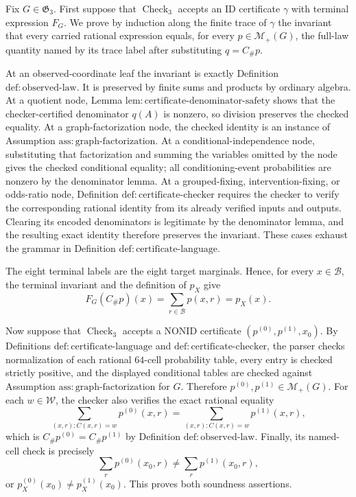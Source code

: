 Fix \(G\in\mathfrak G_3\).  First suppose that \(\operatorname{Check}_3\) accepts an \(\mathrm{ID}\) certificate \(\gamma\) with terminal expression \(F_G\).  We prove by induction along the finite trace of \(\gamma\) the invariant that every carried rational expression equals, for every \(p\in\mathcal M_+(G)\), the full-law quantity named by its trace label after substituting \(q=C_{\#}p\).

At an observed-coordinate leaf the invariant is exactly Definition \(\mathrm{def{:}observed\text{-}law}\).  It is preserved by finite sums and products by ordinary algebra.  At a quotient node, Lemma \(\mathrm{lem{:}certificate\text{-}denominator\text{-}safety}\) shows that the checker-certified denominator \(q(A)\) is nonzero, so division preserves the checked equality.  At a graph-factorization node, the checked identity is an instance of Assumption \(\mathrm{ass{:}graph\text{-}factorization}\).  At a conditional-independence node, substituting that factorization and summing the variables omitted by the node gives the checked conditional equality; all conditioning-event probabilities are nonzero by the denominator lemma.  At a grouped-fixing, intervention-fixing, or odds-ratio node, Definition \(\mathrm{def{:}certificate\text{-}checker}\) requires the checker to verify the corresponding rational identity from its already verified inputs and outputs.  Clearing its encoded denominators is legitimate by the denominator lemma, and the resulting exact identity therefore preserves the invariant.  These cases exhaust the grammar in Definition \(\mathrm{def{:}certificate\text{-}language}\).

The eight terminal labels are the eight target marginals.  Hence, for every \(x\in\mathcal B\), the terminal invariant and the definition of \(p_X\) give
\[
F_G(C_{\#}p)(x)=\sum_{r\in\mathcal B}p(x,r)=p_X(x).
\]

Now suppose that \(\operatorname{Check}_3\) accepts a \(\mathrm{NONID}\) certificate \((p^{(0)},p^{(1)},x_0)\).  By Definitions \(\mathrm{def{:}certificate\text{-}language}\) and \(\mathrm{def{:}certificate\text{-}checker}\), the parser checks normalization of each rational \(64\)-cell probability table, every entry is checked strictly positive, and the displayed conditional tables are checked against Assumption \(\mathrm{ass{:}graph\text{-}factorization}\) for \(G\).  Therefore \(p^{(0)},p^{(1)}\in\mathcal M_+(G)\).  For each \(w\in\mathcal W\), the checker also verifies the exact rational equality
\[
\sum_{(x,r):C(x,r)=w}p^{(0)}(x,r)
=
\sum_{(x,r):C(x,r)=w}p^{(1)}(x,r),
\]
which is \(C_{\#}p^{(0)}=C_{\#}p^{(1)}\) by Definition \(\mathrm{def{:}observed\text{-}law}\).  Finally, its named-cell check is precisely
\[
\sum_r p^{(0)}(x_0,r)\ne\sum_r p^{(1)}(x_0,r),
\]
or \(p_X^{(0)}(x_0)\ne p_X^{(1)}(x_0)\).  This proves both soundness assertions.